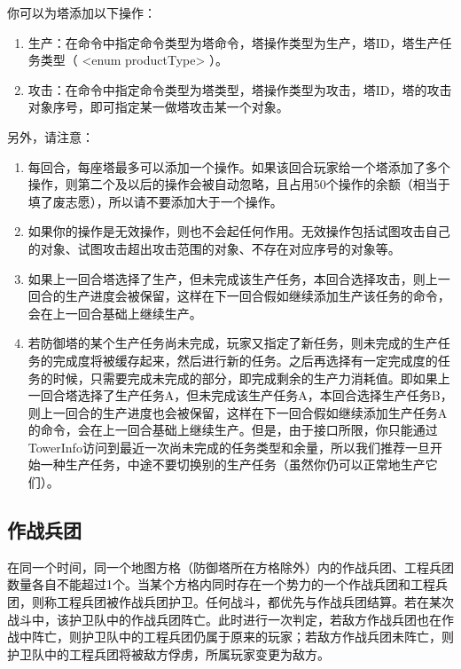 \documentclass[a4paper,4pt]{article}
\begin{document}
你可以为塔添加以下操作：
\begin{enumerate}[fullwidth, itemindent=2em, label=(\arabic*)]
	\item 生产：在命令中指定命令类型为塔命令，塔操作类型为生产，塔ID，塔生产任务类型（ <enum  productType> ）。
	\item 攻击：在命令中指定命令类型为塔类型，塔操作类型为攻击，塔ID，塔的攻击对象序号，即可指定某一做塔攻击某一个对象。
\end{enumerate}
另外，请注意：
\begin{enumerate}[fullwidth, itemindent=2em, label=(\arabic*)]
	\item 每回合，每座塔最多可以添加一个操作。如果该回合玩家给一个塔添加了多个操作，则第二个及以后的操作会被自动忽略，且占用50个操作的余额（相当于填了废志愿），所以请不要添加大于一个操作。
	\item 如果你的操作是无效操作，则也不会起任何作用。无效操作包括试图攻击自己的对象、试图攻击超出攻击范围的对象、不存在对应序号的对象等。
	\item 如果上一回合塔选择了生产，但未完成该生产任务，本回合选择攻击，则上一回合的生产进度会被保留，这样在下一回合假如继续添加生产该任务的命令，会在上一回合基础上继续生产。
	\item 若防御塔的某个生产任务尚未完成，玩家又指定了新任务，则未完成的生产任务的完成度将被缓存起来，然后进行新的任务。之后再选择有一定完成度的任务的时候，只需要完成未完成的部分，即完成剩余的生产力消耗值。即如果上一回合塔选择了生产任务A，但未完成该生产任务A，本回合选择生产任务B，则上一回合的生产进度也会被保留，这样在下一回合假如继续添加生产任务A的命令，会在上一回合基础上继续生产。但是，由于接口所限，你只能通过TowerInfo访问到最近一次尚未完成的任务类型和余量，所以我们推荐一旦开始一种生产任务，中途不要切换别的生产任务（虽然你仍可以正常地生产它们）。
\end{enumerate}
\subsection{作战兵团}
在同一个时间，同一个地图方格（防御塔所在方格除外）内的作战兵团、工程兵团数量各自不能超过1个。当某个方格内同时存在一个势力的一个作战兵团和工程兵团，则称工程兵团被作战兵团护卫。任何战斗，都优先与作战兵团结算。若在某次战斗中，该护卫队中的作战兵团阵亡。此时进行一次判定，若敌方作战兵团也在作战中阵亡，则护卫队中的工程兵团仍属于原来的玩家；若敌方作战兵团未阵亡，则护卫队中的工程兵团将被敌方俘虏，所属玩家变更为敌方。\par
\end{document}
